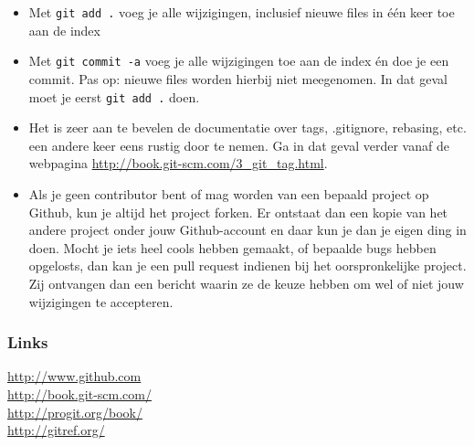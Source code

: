 \begin{itemize}
\item Met {\tt git add .} voeg je alle wijzigingen, inclusief nieuwe
  files in één keer toe aan de index
\item Met {\tt git commit -a} voeg je alle wijzigingen toe aan de
  index én doe je een commit. Pas op: nieuwe files worden hierbij
  niet meegenomen. In dat geval moet je eerst {\tt git add .}
  doen.
\item Het is zeer aan te bevelen de documentatie over tags,
  .gitignore, rebasing, etc. een andere keer eens rustig door te nemen. Ga in dat
  geval verder vanaf de webpagina
  \url{http://book.git-scm.com/3_git_tag.html}. 
\item Als je geen contributor bent of mag worden van een bepaald
  project op Github, kun je altijd het project forken. Er ontstaat dan
  een kopie van het andere project onder jouw Github-account en daar
  kun je dan je eigen ding in doen. Mocht je iets heel cools hebben
  gemaakt, of bepaalde bugs hebben opgelosts, dan kan je een pull
  request indienen bij het oorspronkelijke project. Zij ontvangen dan
  een bericht waarin ze de keuze hebben om wel of niet jouw
  wijzigingen te accepteren.
\end{itemize}

\subsubsection{Links}
\url{http://www.github.com} \\
\url{http://book.git-scm.com/} \\
\url{http://progit.org/book/} \\
\url{http://gitref.org/}

